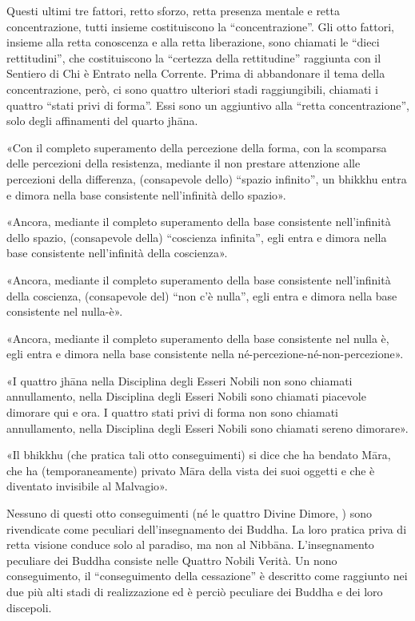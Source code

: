 

 Questi ultimi tre fattori, retto sforzo, retta
presenza mentale e retta concentrazione, tutti insieme costituiscono la
“concentrazione”. Gli otto fattori, insieme alla retta conoscenza e alla
retta liberazione, sono chiamati le “dieci rettitudini”, che
costituiscono la “certezza della rettitudine” raggiunta con il Sentiero
di Chi è Entrato nella Corrente. Prima di abbandonare il tema della
concentrazione, però, ci sono quattro ulteriori stadi raggiungibili,
chiamati i quattro “stati privi di forma”. Essi sono un aggiuntivo alla
“retta concentrazione”, solo degli affinamenti del quarto jhāna.


 «Con il completo superamento della percezione della forma,
con la scomparsa delle percezioni della resistenza, mediante il non
prestare attenzione alle percezioni della differenza, (consapevole
dello) “spazio infinito”, un bhikkhu entra e dimora nella base
consistente nell’infinità dello spazio».


«Ancora, mediante il completo superamento della base consistente
nell’infinità dello spazio, (consapevole della) “coscienza infinita”,
egli entra e dimora nella base consistente nell’infinità della
coscienza».


«Ancora, mediante il completo superamento della base consistente
nell’infinità della coscienza, (consapevole del) “non c’è nulla”, egli
entra e dimora nella base consistente nel nulla-è».


«Ancora, mediante il completo superamento della base consistente nel
nulla è, egli entra e dimora nella base consistente nella
né-percezione-né-non-percezione».


«I quattro jhāna nella Disciplina degli Esseri Nobili non sono chiamati
annullamento, nella Disciplina degli Esseri Nobili sono chiamati
piacevole dimorare qui e ora. I quattro stati privi di forma non sono
chiamati annullamento, nella Disciplina degli Esseri Nobili sono
chiamati sereno dimorare».




«Il bhikkhu (che pratica tali otto conseguimenti) si dice che ha bendato
Māra, che ha (temporaneamente) privato Māra della vista dei suoi oggetti
e che è diventato invisibile al Malvagio».




 Nessuno di questi otto conseguimenti (né le quattro
Divine Dimore, \hyperlink{cap-10-Il-periodo-di-mezzo#pag200b}{}) sono rivendicate come peculiari
dell’insegnamento dei Buddha. La loro pratica priva di retta visione
conduce solo al paradiso, ma non al Nibbāna. L’insegnamento peculiare
dei Buddha consiste nelle Quattro Nobili Verità. Un nono conseguimento, il
“conseguimento della cessazione” è descritto come raggiunto nei due più
alti stadi di realizzazione ed è perciò peculiare dei Buddha e dei loro
discepoli.


